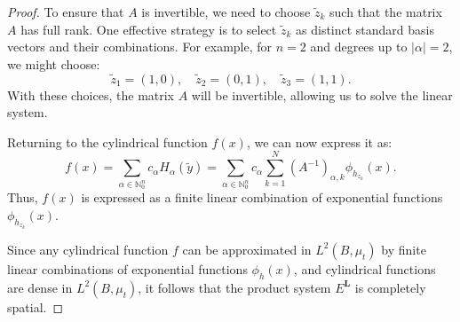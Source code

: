 \documentclass[10pt,a4paper]{amsart}
\begin{document}
\begin{proof}
To ensure that \( A \) is invertible, we need to choose \( \tilde{z}_k \) such that the matrix \( A \) has full rank. One effective strategy is to select \( \tilde{z}_k \) as distinct standard basis vectors and their combinations. For example, for \( n = 2 \) and degrees up to \( |\alpha| = 2 \), we might choose:
\[
\tilde{z}_1 = (1, 0), \quad \tilde{z}_2 = (0, 1), \quad \tilde{z}_3 = (1, 1).
\]
With these choices, the matrix \( A \) will be invertible, allowing us to solve the linear system.


Returning to the cylindrical function \( f(x) \), we can now express it as:
\[
f(x) = \sum_{\alpha \in \mathbb{N}_0^n} c_\alpha H_\alpha\left( \tilde{y} \right) = \sum_{\alpha \in \mathbb{N}_0^n} c_\alpha \sum_{k=1}^N \left( A^{-1} \right)_{\alpha, k} \phi_{h_{z_k}}(x).
\]
Thus, \( f(x) \) is expressed as a finite linear combination of exponential functions \( \phi_{h_{z_k}}(x) \).


Since any cylindrical function \( f \) can be approximated in \( L^2(B, \mu_t) \) by finite linear combinations of exponential functions \( \phi_h(x) \), and cylindrical functions are dense in \( L^2(B, \mu_t) \), it follows that the product system \( E^{\bm{L}} \) is completely spatial.
\end{proof}
\end{document}
